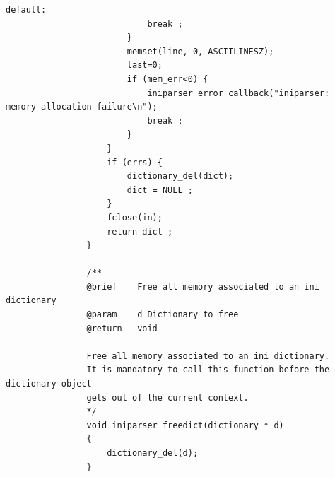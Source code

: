 \documentclass{article}
\begin{document}
\begin{Verbatim}[gobble=8]
                            default:
                            break ;
                        }
                        memset(line, 0, ASCIILINESZ);
                        last=0;
                        if (mem_err<0) {
                            iniparser_error_callback("iniparser: memory allocation failure\n");
                            break ;
                        }
                    }
                    if (errs) {
                        dictionary_del(dict);
                        dict = NULL ;
                    }
                    fclose(in);
                    return dict ;
                }
                
                /**
                @brief    Free all memory associated to an ini dictionary
                @param    d Dictionary to free
                @return   void
                
                Free all memory associated to an ini dictionary.
                It is mandatory to call this function before the dictionary object
                gets out of the current context.
                */
                void iniparser_freedict(dictionary * d)
                {
                    dictionary_del(d);
                }
            \end{Verbatim}
\end{document}
